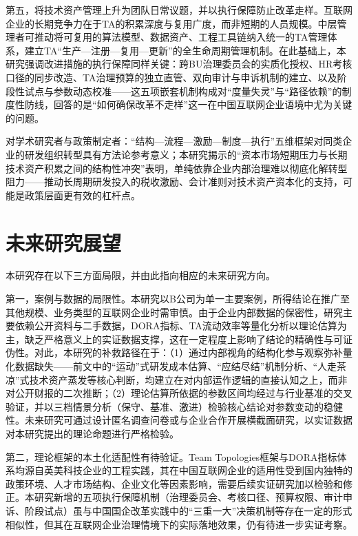 第五，将技术资产管理上升为团队日常议题，并以执行保障防止改革走样。互联网企业的长期竞争力在于TA的积累深度与复用广度，而非短期的人员规模。中层管理者可推动将可复用的算法模型、数据资产、工程工具链纳入统一的TA管理体系，建立TA“生产—注册—复用—更新”的全生命周期管理机制\cite{li2015systematic,seaman2014measuring}。在此基础上，本研究强调改进措施的执行保障同样关键：跨BU治理委员会的实质化授权、HR考核口径的同步改造、TA治理预算的独立直管、双向审计与申诉机制的建立、以及阶段性试点与参数动态校准——这五项嵌套机制构成对“度量失灵”与“路径依赖”的制度性防线，回答的是“如何确保改革不走样”这一在中国互联网企业语境中尤为关键的问题。

对学术研究者与政策制定者：“结构—流程—激励—制度—执行”五维框架对同类企业的研发组织转型具有方法论参考意义；本研究揭示的“资本市场短期压力与长期技术资产积累之间的结构性冲突”表明，单纯依靠企业内部治理难以彻底化解转型阻力——推动长周期研发投入的税收激励、会计准则对技术资产资本化的支持，可能是政策层面更有效的杠杆点。

\section{未来研究展望}

本研究存在以下三方面局限，并由此指向相应的未来研究方向。

第一，案例与数据的局限性。本研究以B公司为单一主要案例，所得结论在推广至其他规模、业务类型的互联网企业时需审慎。由于企业内部数据的保密性，研究主要依赖公开资料与二手数据，DORA指标、TA流动效率等量化分析以理论估算为主，缺乏严格意义上的实证数据支撑，这在一定程度上影响了结论的精确性与可证伪性。对此，本研究的补救路径在于：（1）通过内部视角的结构化参与观察弥补量化数据缺失——前文中的“运动”式研发成本估算、“应结尽结”机制分析、“人走茶凉”式技术资产蒸发等核心判断，均建立在对内部运作逻辑的直接认知之上，而非对公开财报的二次推断；（2）理论估算所依据的参数区间均经过与行业基准的交叉验证，并以三档情景分析（保守、基准、激进）检验核心结论对参数变动的稳健性。未来研究可通过设计匿名调查问卷或与企业合作开展横截面研究，以实证数据对本研究提出的理论命题进行严格检验。

第二，理论框架的本土化适配性有待验证。Team Topologies框架与DORA指标体系均源自英美科技企业的工程实践，其在中国互联网企业的适用性受到国内独特的政策环境、人才市场结构、企业文化等因素影响，需要后续实证研究加以检验和修正\cite{cac2023internet,du2024mixed}。本研究新增的五项执行保障机制（治理委员会、考核口径、预算权限、审计申诉、阶段试点）虽与中国国企改革实践中的“三重一大”决策机制等存在一定的形式相似性，但其在互联网企业治理情境下的实际落地效果，仍有待进一步实证考察。


